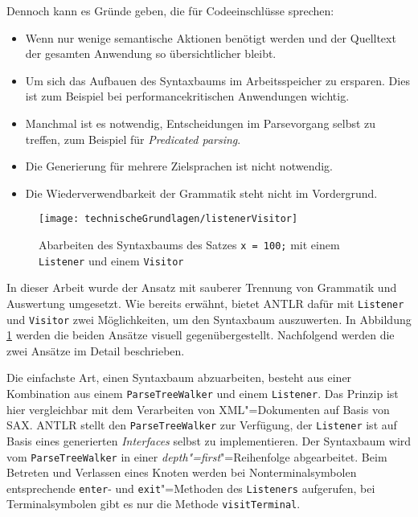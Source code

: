 Dennoch kann es Gründe geben, die für Codeeinschlüsse sprechen:
\begin{itemize}
    \item Wenn nur wenige semantische Aktionen benötigt werden und der Quelltext der gesamten Anwendung so übersichtlicher bleibt.
    \item Um sich das Aufbauen des Syntaxbaums im Arbeitsspeicher zu ersparen. Dies ist zum Beispiel bei performancekritischen Anwendungen wichtig.
    \item Manchmal ist es notwendig, Entscheidungen im Parsevorgang selbst zu treffen, zum Beispiel für \emph{Predicated parsing}.
    \item Die Generierung für mehrere Zielsprachen ist nicht notwendig.
    \item Die Wiederverwendbarkeit der Grammatik steht nicht im Vordergrund.
\end{itemize}

\begin{figure}[b]
    \centering
    \texttt{[image: technischeGrundlagen/listenerVisitor]}
    \caption{Abarbeiten des Syntaxbaums des Satzes \lstinline{x = 100;} mit einem \lstinline{Listener} und einem \lstinline{Visitor} \cite{ANTLR4Reference}}
    \label{fig:listenerVisitor}
\end{figure}

In dieser Arbeit wurde der Ansatz mit sauberer Trennung von Grammatik und Auswertung umgesetzt. Wie bereits erwähnt, bietet ANTLR dafür mit \lstinline{Listener} und \lstinline{Visitor} zwei Möglichkeiten, um den Syntaxbaum auszuwerten. In Abbildung \ref{fig:listenerVisitor} werden die beiden Ansätze visuell gegenübergestellt. Nachfolgend werden die zwei Ansätze im Detail beschrieben.

Die einfachste Art, einen Syntaxbaum abzuarbeiten, besteht aus einer Kombination aus einem \lstinline{ParseTreeWalker} und einem \lstinline{Listener}. Das Prinzip ist hier vergleichbar mit dem Verarbeiten von XML"=Dokumenten auf Basis von SAX. ANTLR stellt den \lstinline{ParseTreeWalker} zur Verfügung, der \lstinline{Listener} ist auf Basis eines generierten \emph{Interfaces} selbst zu implementieren. Der Syntaxbaum wird vom \lstinline{ParseTreeWalker} in einer \emph{depth"=first}"=Reihenfolge abgearbeitet. Beim Betreten und Verlassen eines Knoten werden bei Nonterminalsymbolen entsprechende \lstinline{enter}- und \lstinline{exit}"=Methoden des \lstinline{Listeners} aufgerufen, bei Terminalsymbolen gibt es nur die Methode \lstinline{visitTerminal}.


